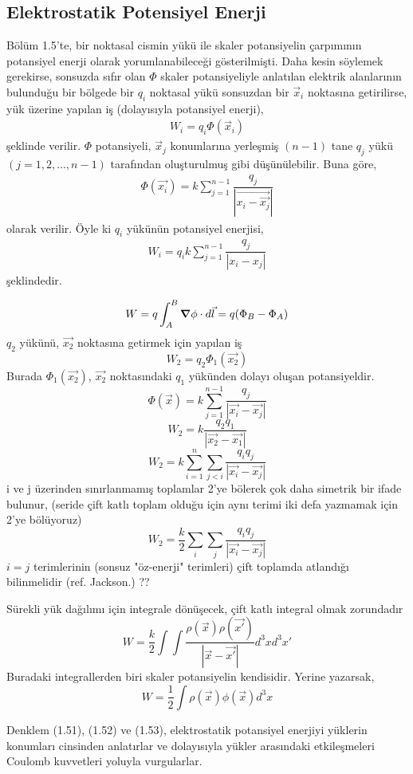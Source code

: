 \subsection{Elektrostatik Potensiyel Enerji}
Bölüm 1.5'te, bir noktasal cismin yükü ile skaler potansiyelin çarpımının potansiyel enerji olarak yorumlanabileceği gösterilmişti. Daha kesin söylemek gerekirse, sonsuzda sıfır olan $\Phi$ skaler potansiyeliyle anlatılan elektrik alanlarının bulunduğu bir bölgede bir $q_{i}$ noktasal yükü sonsuzdan bir $\Vec{x}_{i}$ noktasına getirilirse, yük üzerine yapılan iş (dolayısıyla potansiyel enerji),
\begin{align}
    W_{i} = q_{i} \Phi (\Vec{x}_{i}) \tag{1.47}
\end{align}
şeklinde verilir. $\Phi$ potansiyeli, $\Vec{x}_{j}$ konumlarına yerleşmiş $(n-1)$ tane $q_{j}$ yükü $(j=1,2,...,n-1)$ tarafından oluşturulmuş gibi düşünülebilir. Buna göre,
\begin{align}
    \Phi (\Vec{x_{i}}) = k \sum_{j=1}^{n-1} \dfrac{q_{j}}{|\Vec{x_{i} - \Vec{x_{j}}}|} \tag{1.48}
\end{align}
olarak verilir. Öyle ki $q_{i}$ yükünün potansiyel enerjisi,
\begin{align}
    W_{i} = q_{i} k \sum_{j=1}^{n-1} \dfrac{q_{j}}{|x_{i} - x_{j}|} \tag{1.49}
 \end{align}
 şeklindedir.
\begin{theorem}
\[ W = q \int_{A}^{B} \grad \phi \cdot d\Vec{l} = q (\Phi_{B} - \Phi_{A}) \] 
$q_{2}$ yükünü, $\Vec{x_{2}}$ noktasına getirmek için yapılan iş
\[W_{2} = q_{2} \Phi_{1} (\Vec{x_{2}}) \]
Burada $\Phi_{1} (\Vec{x_{2}})$, $\Vec{x_{2}}$ noktasındaki $q_{1}$ yükünden dolayı oluşan potansiyeldir.
\[ \Phi (\Vec{x}) = k  \sum_{j=1}^{n-1} \dfrac{q_{j}}{|\Vec{x_{i}} - \Vec{x_{j}}|}  \]
\[ W_{2} = k \dfrac{q_{2} q_{1}}{|\Vec{x_{2}} - \Vec{x_{1}}|} \]
\[ W_{2} = k  \sum_{i=1}^{n}  \sum_{j<i} \dfrac{q_{i} q_{j}}{|\Vec{x_{i}} - \Vec{x_{j}}|} \]
i ve j üzerinden sınırlanmamış toplamlar 2'ye bölerek çok daha simetrik bir ifade bulunur, (seride çift katlı toplam olduğu için aynı terimi iki defa yazmamak için 2'ye bölüyoruz)
\[ W_{2} = \dfrac{k}{2}  \sum_{i}  \sum_{j} \dfrac{q_{i} q_{j}}{|\Vec{x_{i}} - \Vec{x_{j}}|} \tag{1.51}\]
$i = j$ terimlerinin (sonsuz "öz-enerji" terimleri) çift toplamda atlandığı bilinmelidir (ref. Jackson.) ??

Sürekli yük dağılımı için integrale dönüşecek, çift katlı integral olmak zorundadır
\[ W = \dfrac{k}{2} \int \int \dfrac{\rho (\Vec{x}) \rho (\Vec{x'})}{|\Vec{x} - \Vec{x'}|} d^{3}x d^{3}x' \tag{1.52}\]
Buradaki integrallerden biri skaler potansiyelin kendisidir. Yerine yazarsak,
\[ W = \dfrac{1}{2} \int \rho (\Vec{x}) \phi (\Vec{x}) d^{3}x \tag{1.53}\]
\end{theorem}
Denklem (1.51), (1.52) ve (1.53), elektrostatik potansiyel enerjiyi yüklerin konumları cinsinden anlatırlar ve dolayısıyla yükler arasındaki etkileşmeleri Coulomb kuvvetleri yoluyla vurgularlar.


